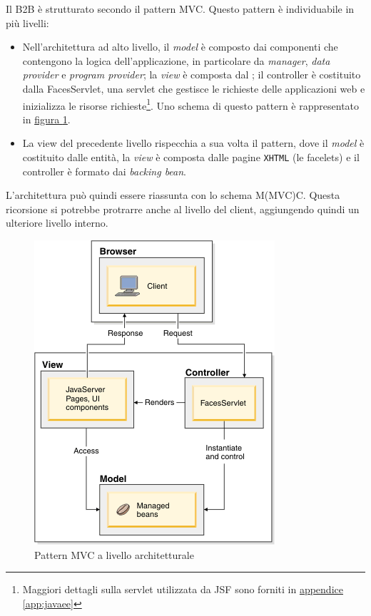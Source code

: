 Il B2B è strutturato secondo il pattern \Gls{MVC}. Questo pattern è individuabile in più livelli:
\begin{itemize}
	\item Nell'architettura ad alto livello, il \textit{model} è composto dai componenti che contengono la logica dell'applicazione, in particolare da \textit{manager}, \textit{data provider} e \textit{program provider}; la \textit{view} è composta dal ; il controller è costituito dalla FacesServlet, una \gls{servlet} che gestisce le richieste delle applicazioni web e inizializza le risorse richieste\footnote{Maggiori dettagli sulla servlet utilizzata da JSF sono forniti in \hyperref[app:javaee]{appendice \ref{app:javaee}}}. Uno schema di questo pattern è rappresentato in \hyperref[fig:mvc-arch]{figura \ref{fig:mvc-arch}}\autocite{bib:jsf-mvc}.
	\item La view del precedente livello rispecchia a sua volta il pattern, dove il \textit{model} è costituito dalle entità, la \textit{view} è composta dalle pagine \texttt{\gls{XHTML}} (le \gls{facelets}) e il controller è formato dai \textit{backing bean}.
\end{itemize}
L'architettura può quindi essere riassunta con lo schema M(MVC)C. Questa ricorsione si potrebbe protrarre anche al livello del client, aggiungendo quindi un ulteriore livello interno.
\begin{figure}
	\centering
	\includegraphics{Immagini/mvc-jsf.png}
	\caption{Pattern MVC a livello architetturale}
	\label{fig:mvc-arch}
\end{figure}

